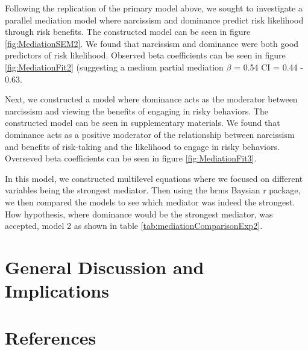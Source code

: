 \documentclass[
  donotrepeattitle,doc, 12pt, a4paper,floatsintext]{apa7}
\begin{document}
Following the replication of the primary model above, we sought to investigate a parallel mediation model where narcissism and dominance predict risk likelihood through risk benefits. The constructed model can be seen in figure \ref{fig:MediationSEM2}. We found that narcissism and dominance were both good predictors of risk likelihood. Observed beta coefficients can be seen in figure \ref{fig:MediationFit2} (suggesting a medium partial mediation \(\beta\) = 0.54 CI = 0.44 - 0.63.

Next, we constructed a model where dominance acts as the moderator between narcissism and viewing the benefits of engaging in risky behaviors. The constructed model can be seen in supplementary materials. We found that dominance acts as a positive moderator of the relationship between narcissism and benefits of risk-taking and the likelihood to engage in risky behaviors. Overseved beta coefficients can be seen in figure \ref{fig:MediationFit3}.

In this model, we constructed multilevel equations where we focused on different variables being the strongest mediator. Then using the brms Baysian r package, we then compared the models to see which mediator was indeed the strongest. How hypothesis, where dominance would be the strongest mediator, was accepted, model 2 as shown in table \ref{tab:mediationComparisonExp2}.

\hypertarget{general-discussion-and-implications}{%
\section{General Discussion and Implications}\label{general-discussion-and-implications}}

\newpage
\newpage

\hypertarget{references}{%
\section{References}\label{references}}

\begingroup
\end{document}
